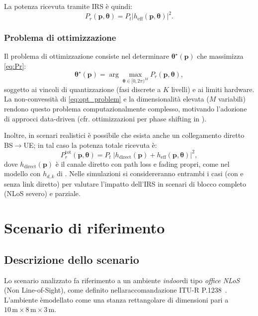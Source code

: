 \documentclass[12pt,a4paper]{report}
\begin{document}
La potenza ricevuta tramite IRS è quindi:
\begin{equation}
  P_r(\mathbf{p}, \boldsymbol{\theta}) =
  P_t \left| h_{\mathrm{eff}}(\mathbf{p}, \boldsymbol{\theta}) \right|^2.
  \label{eq:Pr}
\end{equation}

\subsection{Problema di ottimizzazione}
Il problema di ottimizzazione consiste nel determinare
$\boldsymbol{\theta}^\star(\mathbf{p})$ che massimizza \eqref{eq:Pr}:
\begin{equation}
  \boldsymbol{\theta}^\star(\mathbf{p}) = \arg\max_{\boldsymbol{\theta}
  \in [0, 2\pi)^M} P_r(\mathbf{p}, \boldsymbol{\theta}),
  \label{eq:opt_problem}
\end{equation}
soggetto ai vincoli di quantizzazione (fasi discrete a $K$ livelli) e
ai limiti hardware. La non-convessità di \eqref{eq:opt_problem} e la
dimensionalità elevata ($M$ variabili) rendono questo problema
computazionalmente complesso, motivando l'adozione di approcci
data-driven (cfr. ottimizzazioni per phase
shifting in \cite{guo2021cascaded}).

Inoltre, in scenari realistici è possibile che esista anche un
collegamento diretto BS$\rightarrow$UE; in tal caso la potenza totale
ricevuta è:
\begin{equation}
  P_r^{\text{tot}}(\mathbf{p}, \boldsymbol{\theta}) = P_t\;\left|
  h_{\text{direct}}(\mathbf{p}) + h_{\text{eff}}(\mathbf{p},
  \boldsymbol{\theta}) \right|^2,
  \label{eq:P_r_tot}
\end{equation}
dove $h_{\text{direct}}(\mathbf{p})$ è il canale diretto con path
loss e fading propri, come nel modello con $h_{d,k}$ di
\cite{guo2021cascaded}. Nelle simulazioni si considereranno entrambi
i casi (con e senza link diretto) per valutare l'impatto dell'IRS in
scenari di blocco completo (NLoS severo) e parziale.

\chapter{Scenario di riferimento}
\label{chap:scenario}

\section{Descrizione dello scenario}
\label{sec:scenario}
Lo scenario analizzato fa riferimento a un ambiente \textit{indoor}di
tipo \textit{office NLoS} (Non Line-of-Sight), come definito
nellaraccomandazione ITU-R P.1238~\cite{itu_p1238_2025}. L'ambiente
èmodellato come una stanza rettangolare di dimensioni pari
a $10\,\mathrm{m} \times 8\,\mathrm{m} \times 3\,\mathrm{m}$.
\end{document}
